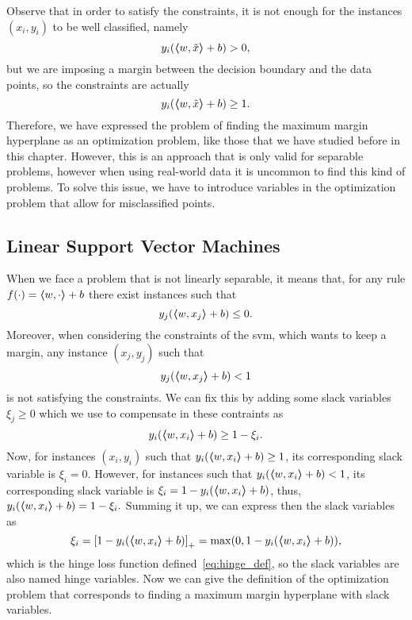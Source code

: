 %
Observe that in order to satisfy the constraints, it is not enough for the instances $(x_i, y_i)$ to be well classified, namely 
$$ y_i (\bm{\left\langle} w, \tilde{x} \bm{\right\rangle} + b) > 0 ,$$
but we are imposing a margin between the decision boundary and the data points, so the constraints are actually 
$$ y_i (\bm{\left\langle} w, \tilde{x} \bm{\right\rangle} + b) \geq 1 .$$
Therefore, we have expressed the problem of finding the maximum margin hyperplane as an optimization problem, like those that we have studied before in this chapter. However, this is an approach that is only valid for separable problems, however when using real-world data it is uncommon to find this kind of problems. To solve this issue, we have to introduce variables in the optimization problem that allow for misclassified points.

\subsection{Linear Support Vector Machines}
%
When we face a problem that is not linearly separable, it means that, for any rule $f(\cdot) = \bm{\left\langle} w, \cdot \bm{\right\rangle} + b$ there exist instances such that 
$$ y_j (\bm{\left\langle} w, x_j \bm{\right\rangle} + b) \leq 0 .$$
Moreover, when considering the constraints of the \acrshort{svm}, which wants to keep a margin, any instance $(x_j, y_j)$ such that 
$$ y_j (\bm{\left\langle} w, x_j \bm{\right\rangle} + b) < 1 $$
is not satisfying the constraints.
%
We can fix this by adding some slack variables $\xi_j \geq 0$ which we use to compensate in these contraints as
$$ y_i (\bm{\left\langle} w, x_i \bm{\right\rangle} + b) \geq 1 - \xi_i. $$
Now, for instances $(x_i, y_i)$ such that $y_i (\bm{\left\langle} w, x_i \bm{\right\rangle} + b) \geq 1$, its corresponding slack variable is $\xi_i = 0$. However, for instances such that $y_i (\bm{\left\langle} w, x_i \bm{\right\rangle} + b) < 1$, its corresponding slack variable is $\xi_i = 1 - y_i (\bm{\left\langle} w, x_i \bm{\right\rangle} + b)$, thus, $y_i (\bm{\left\langle} w, x_i \bm{\right\rangle} + b) = 1 - \xi_i .$
Summing it up, we can express then the slack variables as 
\begin{equation}
    \nonumber
    \xi_i = \left[1 - y_i (\bm{\left\langle} w, x_i \bm{\right\rangle} + b)\right]_{+} = \max(0, 1 - y_i (\bm{\left\langle} w, x_i \bm{\right\rangle} + b)),
\end{equation} 
which is the hinge loss function defined~\eqref{eq:hinge_def}, so the slack variables are also named hinge variables. 
Now we can give the definition of the optimization problem that corresponds to finding a maximum margin hyperplane with slack variables.
